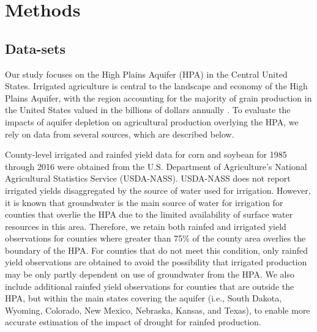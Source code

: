 \documentclass[
]{article}
\begin{document}
\hypertarget{methods}{%
\section{Methods}\label{methods}}

\hypertarget{data-sets}{%
\subsection{Data-sets}\label{data-sets}}

Our study focuses on the High Plains Aquifer (HPA) in the Central United States. Irrigated agriculture is central to the landscape and economy of the High Plains Aquifer, with the region accounting for the majority of grain production in the United States valued in the billions of dollars annually \citep[ \citet{smidt2016complex}]{fenichel2016measuring}. To evaluate the impacts of aquifer depletion on agricultural production overlying the HPA, we rely on data from several sources, which are described below.

County-level irrigated and rainfed yield data for corn and soybean for 1985 through 2016 were obtained from the U.S. Department of Agriculture's National Agricultural Statistics Service (USDA-NASS). USDA-NASS does not report irrigated yields disaggregated by the source of water used for irrigation. However, it is known that groundwater is the main source of water for irrigation for counties that overlie the HPA due to the limited availability of surface water resources in this area. Therefore, we retain both rainfed and irrigated yield observations for counties where greater than 75\% of the county area overlies the boundary of the HPA. For counties that do not meet this condition, only rainfed yield observations are obtained to avoid the possibility that irrigated production may be only partly dependent on use of groundwater from the HPA. We also include additional rainfed yield observations for counties that are outside the HPA, but within the main states covering the aquifer (i.e., South Dakota, Wyoming, Colorado, New Mexico, Nebraska, Kansas, and Texas), to enable more accurate estimation of the impact of drought for rainfed production.
\end{document}
